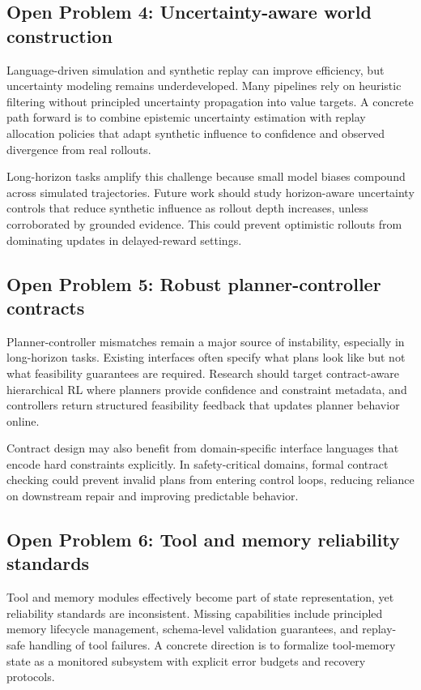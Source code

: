 \documentclass[pdflatex,sn-mathphys-num]{sn-jnl}
\begin{document}
\subsection{Open Problem 4: Uncertainty-aware world construction}
Language-driven simulation and synthetic replay can improve efficiency, but uncertainty modeling remains underdeveloped. Many pipelines rely on heuristic filtering without principled uncertainty propagation into value targets. A concrete path forward is to combine epistemic uncertainty estimation with replay allocation policies that adapt synthetic influence to confidence and observed divergence from real rollouts.

Long-horizon tasks amplify this challenge because small model biases compound across simulated trajectories. Future work should study horizon-aware uncertainty controls that reduce synthetic influence as rollout depth increases, unless corroborated by grounded evidence. This could prevent optimistic rollouts from dominating updates in delayed-reward settings.

\subsection{Open Problem 5: Robust planner-controller contracts}
Planner-controller mismatches remain a major source of instability, especially in long-horizon tasks. Existing interfaces often specify what plans look like but not what feasibility guarantees are required. Research should target contract-aware hierarchical RL where planners provide confidence and constraint metadata, and controllers return structured feasibility feedback that updates planner behavior online.

Contract design may also benefit from domain-specific interface languages that encode hard constraints explicitly. In safety-critical domains, formal contract checking could prevent invalid plans from entering control loops, reducing reliance on downstream repair and improving predictable behavior.

\subsection{Open Problem 6: Tool and memory reliability standards}
Tool and memory modules effectively become part of state representation, yet reliability standards are inconsistent. Missing capabilities include principled memory lifecycle management, schema-level validation guarantees, and replay-safe handling of tool failures. A concrete direction is to formalize tool-memory state as a monitored subsystem with explicit error budgets and recovery protocols.
\end{document}
